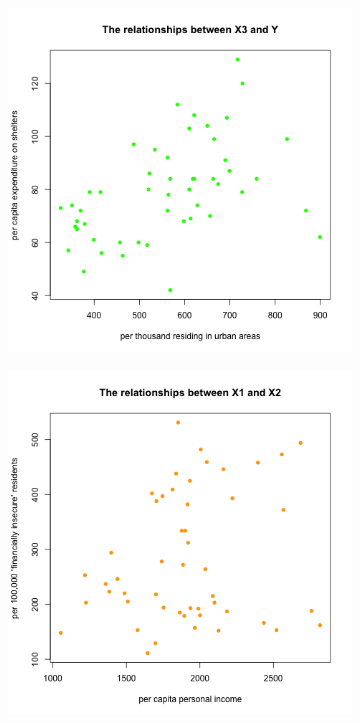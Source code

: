 \documentclass[12pt,letterpaper]{article}
\begin{document}
\begin{itemize}
\begin{figure}[h!]
	\centering
	\begin{subfigure}[b]{0.45\textwidth}
		\includegraphics[width=\textwidth]{PS01_Q2_scplot3.png}
		\label{fig:image1}
	\end{subfigure}
	\hspace{.5cm} 
	\begin{subfigure}[b]{0.45\textwidth}
		\includegraphics[width=\textwidth]{PS01_Q2_scplot4.png}
		\label{fig:image2}
	\end{subfigure}
	\label{fig:main}
\end{figure}


\end{itemize}
\end{document}
